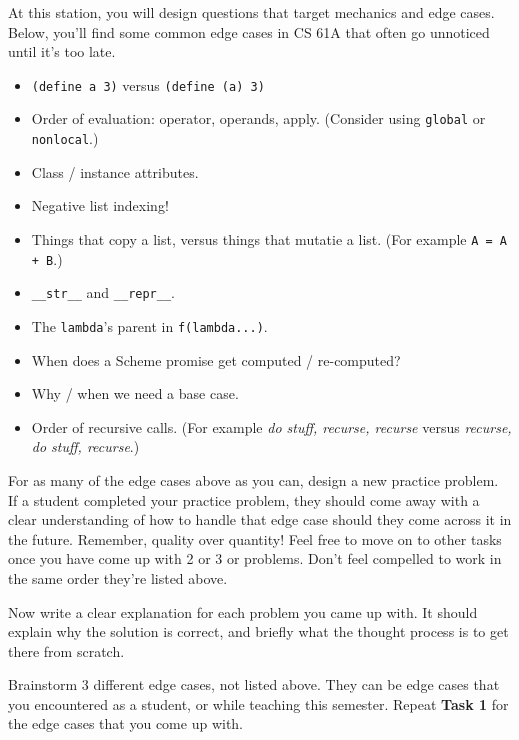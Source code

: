 \documentclass[11pt]{article}
\begin{document}
\maketitle


\name


At this station, you will design questions that target mechanics and edge cases. Below, you'll find some common edge cases in CS 61A that often go unnoticed until it's too late.
\begin{itemize}
    \item \texttt{(define a 3)} versus \texttt{(define (a) 3)}
    \item Order of evaluation: operator, operands, apply. (Consider using \texttt{global} or \texttt{nonlocal}.)
    \item Class / instance attributes.
    \item Negative list indexing!
    \item Things that copy a list, versus things that mutatie a list. (For example \texttt{A = A + B}.)
    \item \texttt{\_\_str\_\_} and \texttt{\_\_repr\_\_}.
    \item The \texttt{lambda}'s parent in \texttt{f(lambda...)}.
    \item When does a Scheme promise get computed / re-computed?
    \item Why / when we need a base case.
    \item Order of recursive calls. (For example \textit{do stuff, recurse, recurse} versus \textit{recurse, do stuff, recurse}.)
\end{itemize}


\begin{qlist}

For as many of the edge cases above as you can, design a new practice problem. If a student completed your practice problem, they should come away with a clear understanding of how to handle that edge case should they come across it in the future. Remember, quality over quantity! Feel free to move on to other tasks once you have come up with 2 or 3 or problems. Don't feel compelled to work in the same order they're listed above.

Now write a clear explanation for each problem you came up with. It should explain why the solution is correct, and briefly what the thought process is to get there from scratch.

Brainstorm 3 different edge cases, not listed above. They can be edge cases that you encountered as a student, or while teaching this semester. Repeat \textbf{Task 1} for the edge cases that you come up with.

\end{qlist}
\end{document}
